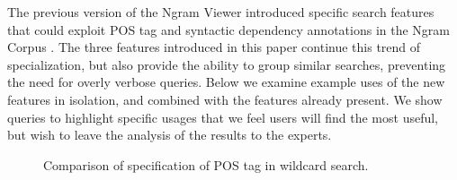 \documentclass[11pt,a4paper]{article}
\begin{document}
The previous version of the Ngram Viewer introduced specific search features that could exploit POS tag and syntactic dependency annotations in the Ngram Corpus \cite{lin2012syntactic}. The three features introduced in this paper continue this trend of specialization, but also provide the ability to group similar searches, preventing the need for overly verbose queries. Below we examine example uses of the new features in isolation, and combined with the features already present. We show queries to highlight specific usages that we feel users will find the most useful, but wish to leave the analysis of the results to the experts.

\begin{figure}[t]
\vspace*{-1em}
\caption{\label{fig:light} Comparison of specification of POS tag in wildcard search.}
\end{figure}
\end{document}
